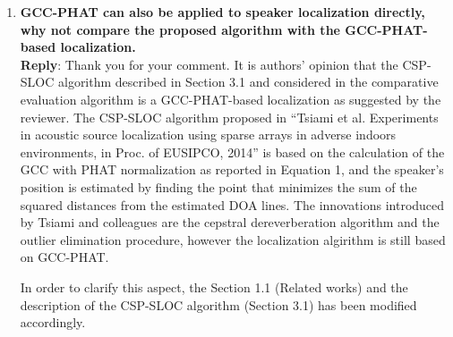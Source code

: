 \documentclass[11pt, technote, letterpaper, oneside, onecolumn]{IEEEtran}
\begin{document}
\begin{enumerate}
\item  \textbf{GCC-PHAT can also be applied to speaker localization directly, why not compare the proposed algorithm with the GCC-PHAT-based localization. \\}
\textbf{Reply}: Thank you for your comment. It is authors' opinion that the CSP-SLOC algorithm described in Section 3.1 and considered in the comparative evaluation algorithm is a GCC-PHAT-based localization as suggested by the reviewer. The CSP-SLOC algorithm proposed in ``Tsiami et al. Experiments in acoustic source localization using sparse arrays in adverse indoors environments, in Proc. of EUSIPCO, 2014'' is based on the calculation of the GCC with PHAT normalization as reported in Equation 1, and the speaker's position is estimated by finding the point that minimizes the sum of the squared distances from the estimated DOA lines. The innovations introduced by Tsiami and colleagues are the cepstral dereverberation algorithm and the outlier elimination procedure, however the localization algirithm is still based on GCC-PHAT.

In order to clarify this aspect, the Section 1.1 (Related works) and the description of the CSP-SLOC algorithm (Section 3.1) has been modified accordingly.


\end{enumerate}
\end{document}
